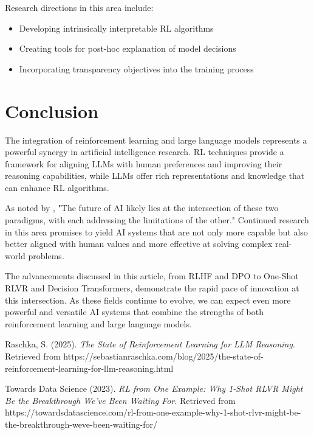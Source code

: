 \documentclass{article}
\begin{document}
Research directions in this area include:
\begin{itemize}
    \item Developing intrinsically interpretable RL algorithms
    \item Creating tools for post-hoc explanation of model decisions
    \item Incorporating transparency objectives into the training process
\end{itemize}

\section{Conclusion}

The integration of reinforcement learning and large language models represents a powerful synergy in artificial intelligence research. RL techniques provide a framework for aligning LLMs with human preferences and improving their reasoning capabilities, while LLMs offer rich representations and knowledge that can enhance RL algorithms.

As noted by \cite{raschka2025}, "The future of AI likely lies at the intersection of these two paradigms, with each addressing the limitations of the other." Continued research in this area promises to yield AI systems that are not only more capable but also better aligned with human values and more effective at solving complex real-world problems.

The advancements discussed in this article, from RLHF and DPO to One-Shot RLVR and Decision Transformers, demonstrate the rapid pace of innovation at this intersection. As these fields continue to evolve, we can expect even more powerful and versatile AI systems that combine the strengths of both reinforcement learning and large language models.

\begin{thebibliography}{9}
Raschka, S. (2025). \textit{The State of Reinforcement Learning for LLM Reasoning}. Retrieved from https://sebastianraschka.com/blog/2025/the-state-of-reinforcement-learning-for-llm-reasoning.html

Towards Data Science (2023). \textit{RL from One Example: Why 1-Shot RLVR Might Be the Breakthrough We've Been Waiting For}. Retrieved from https://towardsdatascience.com/rl-from-one-example-why-1-shot-rlvr-might-be-the-breakthrough-weve-been-waiting-for/
\end{thebibliography}
\end{document}
